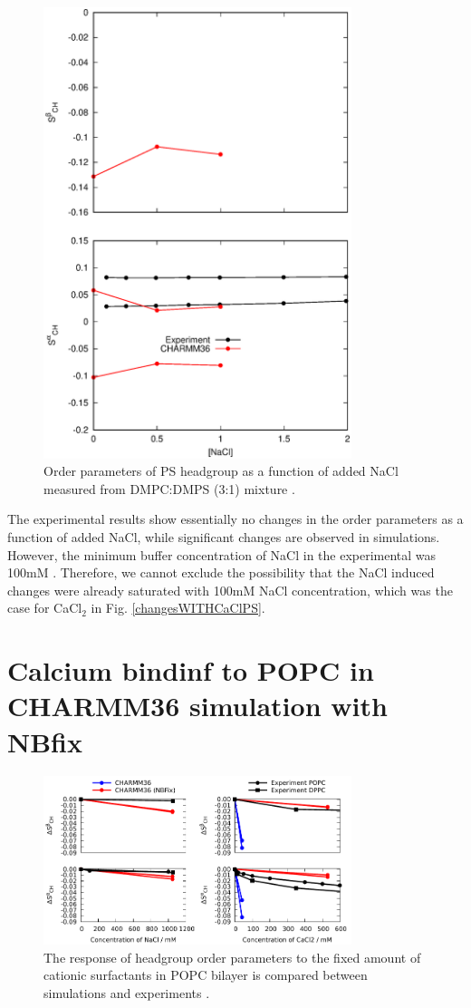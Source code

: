 \documentclass[journal=jpcbfk]{achemso}
\begin{document}
\begin{figure}[]
  \centering
  \includegraphics[width=9.0cm]{../Figs/PSresponseTONaCl.eps}
  \caption{\label{PSresponseTONaClDMPC}
    Order parameters of PS headgroup as a function of added NaCl measured from DMPC:DMPS (3:1) mixture \cite{roux86}.
  }
\end{figure}
The experimental results show essentially no changes in the order parameters as a function of
added NaCl, while significant changes are observed in simulations. However,
the minimum buffer concentration of NaCl in the experimental was 100mM \cite{roux86}.
Therefore, we cannot exclude the possibility that the NaCl induced changes were already
saturated with 100mM NaCl concentration, which was the case for CaCl$_2$ in Fig. \ref{changesWITHCaClPS}.
\pagebreak

\section{Calcium bindinf to POPC in CHARMM36 simulation with NBfix}

\begin{figure}[]
  \centering
  \includegraphics[width=9.0cm]{../Figs/OP_CHARMM_CaCl_POPC_NBFix.pdf}
  \caption{\label{OP_CHARMM_CaCl_POPC_NBFix}
  The response of headgroup order parameters to the fixed amount of cationic surfactants in
  POPC bilayer is compared between simulations and experiments \cite{scherer89}.}
\end{figure}
\end{document}
